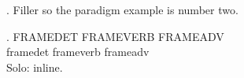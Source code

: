 

\ex. Filler so the paradigm example is number two.

\exg. FRAMEDET  FRAMEVERB FRAMEADV\\
      framedet  frameverb frameadv\\

\noindent Solo:  inline.

